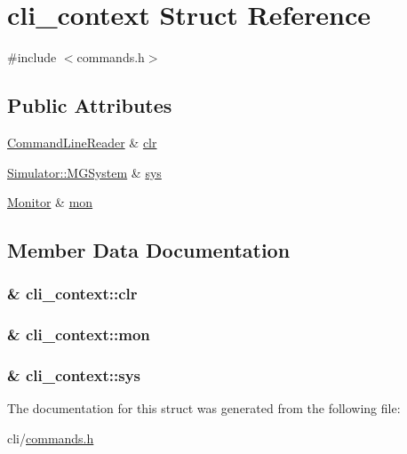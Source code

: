 \hypertarget{structcli__context}{\section{cli\+\_\+context Struct Reference}
\label{structcli__context}
}


{\ttfamily \#include $<$commands.\+h$>$}

\subsection*{Public Attributes}
\begin{DoxyCompactItemize}
\item 
\hyperlink{class_command_line_reader}{Command\+Line\+Reader} \& \hyperlink{structcli__context_abf832d168ae5955892ff559c4aa112da}{clr}
\item 
\hyperlink{class_simulator_1_1_m_g_system}{Simulator\+::\+M\+G\+System} \& \hyperlink{structcli__context_a028b40ecb4313d10b2ceb38a326200d4}{sys}
\item 
\hyperlink{class_monitor}{Monitor} \& \hyperlink{structcli__context_a6e0110081cf5df304b0dd269204583dc}{mon}
\end{DoxyCompactItemize}


\subsection{Member Data Documentation}
\hypertarget{structcli__context_abf832d168ae5955892ff559c4aa112da}{
\subsubsection[{clr}]{\& cli\+\_\+context\+::clr}}\label{structcli__context_abf832d168ae5955892ff559c4aa112da}
\hypertarget{structcli__context_a6e0110081cf5df304b0dd269204583dc}{
\subsubsection[{mon}]{\& cli\+\_\+context\+::mon}}\label{structcli__context_a6e0110081cf5df304b0dd269204583dc}
\hypertarget{structcli__context_a028b40ecb4313d10b2ceb38a326200d4}{
\subsubsection[{sys}]{\& cli\+\_\+context\+::sys}}\label{structcli__context_a028b40ecb4313d10b2ceb38a326200d4}


The documentation for this struct was generated from the following file\+:\begin{DoxyCompactItemize}
\item 
cli/\hyperlink{commands_8h}{commands.\+h}\end{DoxyCompactItemize}
